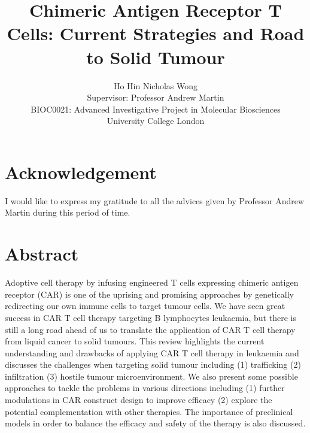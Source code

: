 \documentclass[12pt,oneside]{report}
\title{Chimeric Antigen Receptor T Cells: Current Strategies and Road to Solid Tumour}
\author{Ho Hin Nicholas Wong \\ Supervisor: Professor Andrew Martin \\ BIOC0021: Advanced Investigative Project in Molecular Biosciences \\ University College London}
\date{}
\begin{document}
 
\maketitle{} 


\chapter*{Acknowledgement}
I would like to express my gratitude to all the advices given by Professor Andrew Martin during this period of time.
\chapter*{Abstract}
Adoptive cell therapy by infusing engineered T cells expressing chimeric antigen receptor (CAR) is one of the uprising and promising approaches by genetically redirecting our own immune cells to target tumour cells. We have seen great success in CAR T cell therapy targeting B lymphocytes leukaemia, but there is still a long road ahead of us to translate the application of CAR T cell therapy from liquid cancer to solid tumours. This review highlights the current understanding and drawbacks of applying CAR T cell therapy in leukaemia and discusses the challenges when targeting solid tumour including (1) trafficking (2) infiltration (3) hostile tumour microenvironment. We also present some possible approaches to tackle the problems in various directions including (1) further modulations in CAR construct design to improve efficacy (2) explore the potential complementation with other therapies. The importance of preclinical models in order to balance the efficacy and safety of the therapy is also discussed.

\tableofcontents

\newpage
\end{document}
